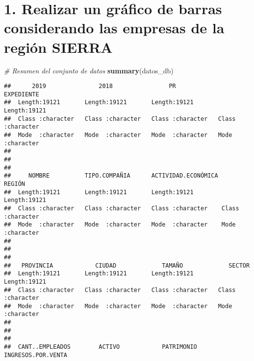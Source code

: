 \documentclass[
]{article}
\newenvironment{Shaded}{\begin{snugshade}}{\end{snugshade}}
\newcommand{\CommentTok}[1]{\textcolor[rgb]{0.56,0.35,0.01}{\textit{#1}}}
\newcommand{\FunctionTok}[1]{\textcolor[rgb]{0.13,0.29,0.53}{\textbf{#1}}}
\newcommand{\NormalTok}[1]{#1}
\begin{document}
\hypertarget{realizar-un-gruxe1fico-de-barras-considerando-las-empresas-de-la-regiuxf3n-sierra}{%
\section{1. Realizar un gráfico de barras considerando las empresas de
la región
SIERRA}\label{realizar-un-gruxe1fico-de-barras-considerando-las-empresas-de-la-regiuxf3n-sierra}}

\begin{Shaded}
\begin{Highlighting}[]
\CommentTok{\# Resumen del conjunto de datos}
\FunctionTok{summary}\NormalTok{(datos\_db)}
\end{Highlighting}
\end{Shaded}

\begin{verbatim}
##      2019               2018                PR             EXPEDIENTE       
##  Length:19121       Length:19121       Length:19121       Length:19121      
##  Class :character   Class :character   Class :character   Class :character  
##  Mode  :character   Mode  :character   Mode  :character   Mode  :character  
##                                                                             
##                                                                             
##                                                                             
##     NOMBRE          TIPO.COMPAÑIA      ACTIVIDAD.ECONÓMICA    REGIÓN         
##  Length:19121       Length:19121       Length:19121        Length:19121      
##  Class :character   Class :character   Class :character    Class :character  
##  Mode  :character   Mode  :character   Mode  :character    Mode  :character  
##                                                                              
##                                                                              
##                                                                              
##   PROVINCIA            CIUDAD             TAMAÑO             SECTOR         
##  Length:19121       Length:19121       Length:19121       Length:19121      
##  Class :character   Class :character   Class :character   Class :character  
##  Mode  :character   Mode  :character   Mode  :character   Mode  :character  
##                                                                             
##                                                                             
##                                                                             
##  CANT..EMPLEADOS        ACTIVO            PATRIMONIO       INGRESOS.POR.VENTA

\end{verbatim}
\end{document}
